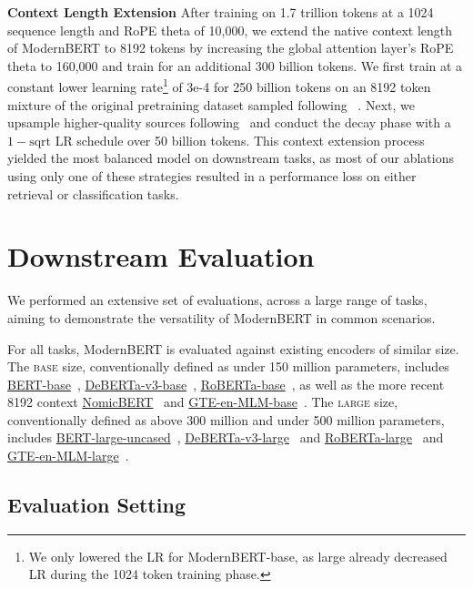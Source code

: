 \documentclass[11pt]{article}
\begin{document}
\textbf{Context Length Extension}
After training on 1.7 trillion tokens at a 1024 sequence length and RoPE theta of 10,000, we extend the native context length of ModernBERT to 8192 tokens by increasing the global attention layer’s RoPE theta to 160,000 and train for an additional 300 billion tokens. We first train at a constant lower learning rate\footnote{We only lowered the LR for ModernBERT-base, as large already decreased LR during the 1024 token training phase.} of 3e-4 for 250 billion tokens on an 8192 token mixture of the original pretraining dataset sampled following ~\citet{dataengineering}. Next, we upsample higher-quality sources following~\citet{prolong} and conduct the decay phase with a $1-\text{sqrt}$ LR schedule over 50 billion tokens. This context extension process yielded the most balanced model on downstream tasks, as most of our ablations using only one of these strategies resulted in a performance loss on either retrieval or classification tasks.

\section{Downstream Evaluation}
We performed an extensive set of evaluations, across a large range of tasks, aiming to demonstrate the versatility of ModernBERT in common scenarios.


For all tasks, ModernBERT is evaluated against existing encoders of similar size. The \textsc{base} size, conventionally defined as under 150 million parameters, includes \href{https://huggingface.co/google-bert/bert-base-uncased}{BERT-base}~\cite{bert}, \href{https://huggingface.co/microsoft/deberta-v3-base}{DeBERTa-v3-base}~\cite{debertav3}, \href{https://huggingface.co/FacebookAI/roberta-base}{RoBERTa-base}~\cite{roberta}, as well as the more recent 8192 context \href{https://huggingface.co/nomic-ai/NomicBERT-2048}{NomicBERT}~\cite{nomic} and \href{https://huggingface.co/Alibaba-NLP/GTE-en-MLM-base}{GTE-en-MLM-base}~\cite{gte}. The \textsc{large} size, conventionally defined as above 300 million and under 500 million parameters, includes \href{https://huggingface.co/google-bert/bert-large-uncased}{BERT-large-uncased}~\cite{bert}, \href{https://huggingface.co/microsoft/deberta-v3-large}{DeBERTa-v3-large}~\cite{debertav3} and \href{https://huggingface.co/FacebookAI/roberta-large}{RoBERTa-large}~\cite{roberta} and \href{https://huggingface.co/Alibaba-NLP/GTE-en-MLM-large}{GTE-en-MLM-large}~\cite{gte}. 

\subsection{Evaluation Setting}
\end{document}
